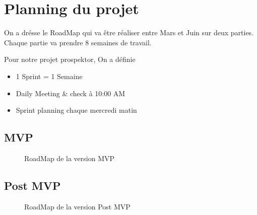 \section{Planning du projet}
On a dr\'esse le RoadMap qui va \^etre r\'ealiser entre Mars et Juin sur deux parties. Chaque partie va prendre 8 semaines de travail.

Pour notre projet prospektor, On a d\'efinie 
\begin{itemize}
\item 1 Sprint = 1 Semaine
\item Daily Meeting \& check \`a 10:00 AM
\item Sprint planning chaque mercredi matin
\end{itemize}

\subsection{\gls{MVP}}
\begin{figure}[H]
	\caption{\label{fig:my-label} RoadMap de la version \gls{MVP}}
\end{figure}
\subsection{Post MVP}
\begin{figure}[H]
	\caption{\label{fig:my-label} RoadMap de la version Post MVP}
\end{figure}

